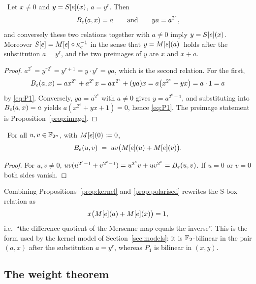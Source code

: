 \begin{proposition}\label{prop:kernel}
\Proved\ Let $x\ne0$ and $y=S[e](x)$, $a=y^{r}$. Then
\[
  B_e(a,x)=a \qquad\text{and}\qquad ya=a^{2^e} ,
\]
and conversely these two relations together with $a\neq 0$ imply $y=S[e](x)$. Moreover
$S[e]=M[e]\circ\kappa_e^{-1}$ in the sense that $y=M[e](a)^{\,}$ holds after the
substitution $a=y^r$, and the two preimages of $y$ are $x$ and $x+a$.
\end{proposition}
\begin{proof}
$a^{2^e}=y^{r2^e}=y^{r+1}=y\cdot y^{r}=ya$, which is the second relation. For the first,
\[
  B_e(a,x)=ax^{2^e}+a^{2^e}x=ax^{2^e}+(ya)x=a\bigl(x^{2^e}+yx\bigr)=a\cdot 1=a
\]
by \eqref{eq:P1}. Conversely, $ya=a^{2^e}$ with $a\ne0$ gives $y=a^{2^e-1}$, and substituting into
$B_e(a,x)=a$ yields $a(x^{2^e}+yx+1)=0$, hence \eqref{eq:P1}. The preimage statement is
Proposition~\ref{prop:image}.
\end{proof}

\begin{proposition}\label{prop:polarised}
\Proved\ For all $u,v\in\mathbb{F}_{2^n}$, with $M[e](0):=0$,
\[
  B_e(u,v)\;=\;uv\bigl(M[e](u)+M[e](v)\bigr) .
\]
\end{proposition}
\begin{proof}
For $u,v\ne0$, $uv(u^{2^e-1}+v^{2^e-1})=u^{2^e}v+uv^{2^e}=B_e(u,v)$. If $u=0$ or $v=0$ both
sides vanish.
\end{proof}

Combining Propositions~\ref{prop:kernel} and \ref{prop:polarised} rewrites the S-box relation as
\begin{equation}\label{eq:difference-quotient}
  x\bigl(M[e](a)+M[e](x)\bigr)=1 ,
\end{equation}
i.e.\ ``the difference quotient of the Mersenne map equals the inverse''. This is the form used by
the kernel model of Section~\ref{sec:models}: it is $\mathbb{F}_2$-bilinear in the pair $(a,x)$ after the
substitution $a=y^{r}$, whereas $P_1$ is bilinear in $(x,y)$.

\subsection{The weight theorem}

